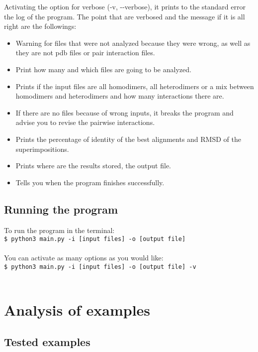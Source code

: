 \documentclass[a4paper,10pt]{report}
\begin{document}
Activating the option for verbose (-v, -{}-verbose), it prints to the standard error the log of the program. The point that are verbosed and the message if it is all right are the followings:

\begin{itemize}
 \item Warning for files that were not analyzed because they were wrong, as well as they are not pdb files or pair interaction files.
 \item Print how many and which files are going to be analyzed.
 \item Prints if the input files are all homodimers, all heterodimers or a mix between homodimers and heterodimers and how many interactions there are.
 \item If there are no files because of wrong inputs, it breaks the program and advise you to revise the pairwise interactions.
 \item Prints the percentage of identity of the best alignments and RMSD of the superimpositions.
 \item Prints where are the results stored, the output file.
 \item Tells you when the program finishes successfully.
\end{itemize}

\section{Running the program}

To run the program in the terminal:\\ \texttt{\$ python3 main.py -i [input files] -o [output file]} \\\\ You can activate as many options as you would like:\\ \texttt{\$ python3 main.py -i [input files] -o [output file] -v }\\\\



\chapter{Analysis of examples}

\section{Tested examples}
\end{document}
